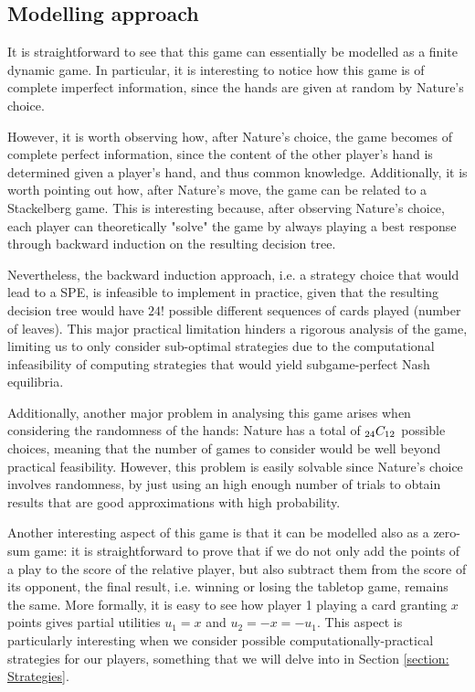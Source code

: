 \subsection{Modelling approach}

It is straightforward to see that this game can essentially be modelled as a finite dynamic game.
In particular, it is interesting to notice how this game is of complete imperfect information, since the hands are given at random by Nature's choice.

However, it is worth observing how, after Nature's choice, the game becomes of complete perfect information, since the content of the other player's hand is determined given a player's hand, and thus common knowledge.
Additionally, it is worth pointing out how, after Nature's move, the game can be related to a Stackelberg game.
This is interesting because, after observing Nature's choice, each player can theoretically "solve" the game by always playing a best response through backward induction on the resulting decision tree.

Nevertheless, the backward induction approach, i.e. a strategy choice that would lead to a SPE, is infeasible to implement in practice, given that the resulting decision tree would have $24!$ possible different sequences of cards played (number of leaves).
This major practical limitation hinders a rigorous analysis of the game, limiting us to only consider sub-optimal strategies due to the computational infeasibility of computing strategies that would yield subgame-perfect Nash equilibria.

Additionally, another major problem in analysing this game arises when considering the randomness of the hands: Nature has a total of ${}_{24}C_{12}$ possible choices, meaning that the number of games to consider would be well beyond practical feasibility.
However, this problem is easily solvable since Nature's choice involves randomness, by just using an high enough number of trials to obtain results that are good approximations with high probability.

Another interesting aspect of this game is that it can be modelled also as a zero-sum game: it is straightforward to prove that if we do not only add the points of a play to the score of the relative player, but also subtract them from the score of its opponent, the final result, i.e. winning or losing the tabletop game, remains the same. More formally, it is easy to see how player 1 playing a card granting $x$ points gives partial utilities $u_1 = x$ and $u_2 = -x = -u_1$.
This aspect is particularly interesting when we consider possible computationally-practical strategies for our players, something that we will delve into in Section \ref{section: Strategies}.

